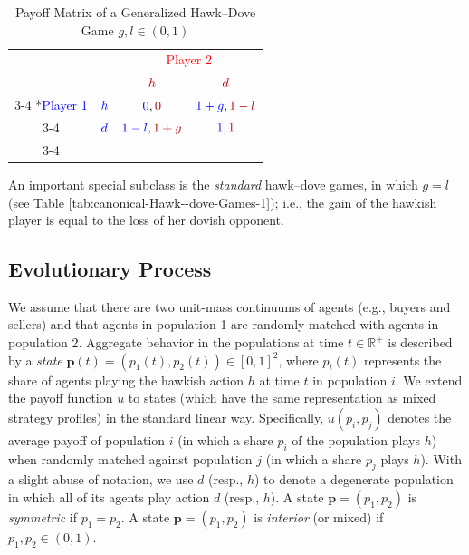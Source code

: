 \documentclass[12pt]{article}
\numberwithin{equation}{section}
\numberwithin{figure}{section}
\theoremstyle{definition}
\theoremstyle{plain}
\theoremstyle{plain}
\theoremstyle{plain}
\theoremstyle{remark}
\theoremstyle{plain}
\theoremstyle{plain}
\begin{document}
\begin{table}
\begin{centering}
\caption{Payoff Matrix of a Generalized Hawk--Dove Game $g,l\in\left(0,1\right)$ \label{tab:Generalized-Hawk--dove-Games}}
\par\end{centering}
\smallskip{}
\centering
    \setlength{\extrarowheight}{2pt}
    \begin{tabular}{cc|c|c|}
      & \multicolumn{1}{c}{} & \multicolumn{2}{c}{\textcolor{red}{Player 2} \vspace{-0.5em}}\\
      & \multicolumn{1}{c}{} & \multicolumn{1}{c}{$\textcolor{red}{h}$}  & \multicolumn{1}{c}{$\textcolor{red}{d}$} \\\cline{3-4}
      \multirow{2}*{\textcolor{blue}{Player 1}}  & $\textcolor{blue}{h}$ & $\textcolor{blue}{0},\textcolor{red}{0}$ & $\textcolor{blue}{1+g},\textcolor{red}{1-l}$ \\\cline{3-4}
      & $\textcolor{blue}{d}$ & $\textcolor{blue}{1-l},\textcolor{red}{1+g}$ & $\textcolor{blue}{1},\textcolor{red}{1}$ \\\cline{3-4}
    \end{tabular}
  \end{table}
An important special 
subclass  is
the \emph{standard} hawk--dove games, 
in which $g=l$ (see Table \ref{tab:canonical-Hawk--dove-Games-1}); i.e., the gain of the hawkish player is equal to the loss of her dovish opponent.
\subsection{Evolutionary Process}

We assume that there are two unit-mass continuums of agents 
(e.g., buyers and sellers) and that
agents in population 1 are randomly matched with agents in population
2. Aggregate behavior in the populations
at time $t\in\mathbb{R}^{+}$ is described by a \emph{state}
$\mathbf{p}\left(t\right)=\left(p_{1}\left(t\right),p_{2}\left(t\right)\right)\in\left[0,1\right]^{2}$,
where $p_{i}\left(t\right)$ represents the share of agents playing
the hawkish action $h$ at time $t$ in population $i$. We extend
the payoff function $u$ to states (which have the same
representation as mixed strategy profiles) in the standard linear
way. Specifically, $u(p_i,p_j)$ denotes the average payoff of population $i$ (in which a share $p_i$ of the population plays $h$)   
when randomly matched against population $j$ (in which a share $p_j$  plays $h$).
With a slight abuse of notation, we use $d$ (resp., $h$)
to denote a degenerate population in which all of its agents play action $d$ (resp., $h$).
A state $\mathbf{p}=\left(p_{1},p_{2}\right)$ is \emph{symmetric} if $p_{1}=p_{2}$. 
A state $\mathbf{p}=\left(p_{1},p_{2}\right)$ is \emph{interior} (or mixed) if $p_1,p_2\in(0,1).$ 
\end{document}

